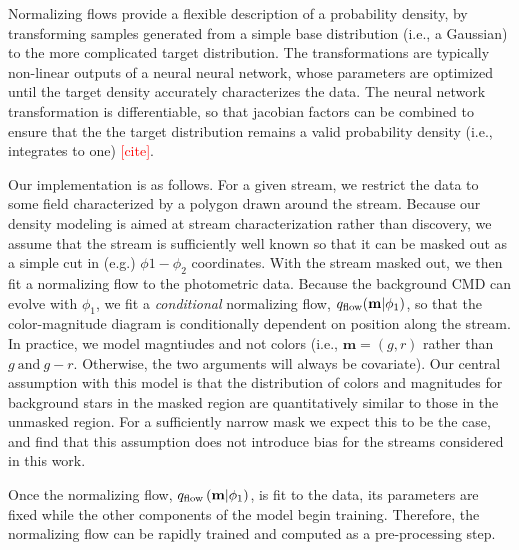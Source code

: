 \documentclass[twocolumn]{aastex631}
\newcommand{\TODO}[1]{{\textcolor{red}{#1}}}
\begin{document}
            Normalizing flows provide a flexible description of a probability
            density, by transforming samples generated from a simple base
            distribution (i.e., a Gaussian) to the more complicated target
            distribution. The transformations are typically non-linear outputs
            of a neural neural network, whose parameters are optimized until the
            target density accurately characterizes the data. The neural network
            transformation is differentiable, so that jacobian factors can be
            combined to ensure that the the target distribution remains a valid
            probability density (i.e., integrates to one) \TODO{[cite]}.  

            Our implementation is as follows. For a given stream, we restrict
            the data to some field characterized by a polygon drawn around the
            stream. Because our density modeling is aimed at stream
            characterization rather than discovery, we assume that the stream is
            sufficiently well known so that it can be masked out as a simple cut
            in (e.g.) $\phi1-\phi_2$ coordinates. With the stream masked out, we
            then fit a normalizing flow to the photometric data. Because the
            background CMD can evolve with $\phi_1$, we fit a \emph{conditional}
            normalizing flow, $q_{\rm flow}(\mathbf{m}|\phi_1)$, so that the
            color-magnitude diagram is conditionally dependent on position along
            the stream. In practice, we model magntiudes and not colors (i.e.,
            $\mathbf{m} = (g,r)$ rather than $g \ \mathrm{and} \ g-r$.
            Otherwise, the two arguments will always be covariate). Our central
            assumption with this model is that the distribution of colors and
            magnitudes for background stars in the masked region are
            quantitatively similar to those in the unmasked region. For a
            sufficiently narrow mask we expect this to be the case, and find
            that this assumption does not introduce bias for the streams
            considered in this work.
                
            Once the normalizing flow, $q_{\rm flow}\left(\mathbf{m} |
            \phi_1\right)$, is fit to the data, its parameters are fixed while
            the other components of the model begin training. Therefore, the
            normalizing flow can be rapidly trained and computed as a
            pre-processing step.
\end{document}
